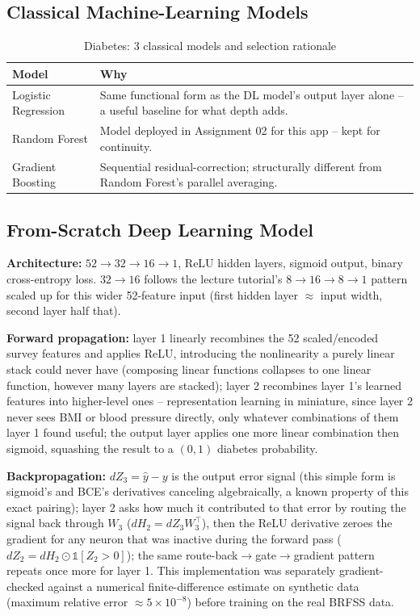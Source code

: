 \documentclass[11pt, a4paper]{article}
\begin{document}
\subsection{Classical Machine-Learning Models}
\begin{table}[H]
\centering
\begin{tabularx}{\textwidth}{@{}l X@{}}
\toprule
\textbf{Model} & \textbf{Why} \\
\midrule
Logistic Regression & Same functional form as the DL model's output layer alone -- a
useful baseline for what depth adds. \\
Random Forest & Model deployed in Assignment 02 for this app -- kept for continuity. \\
Gradient Boosting & Sequential residual-correction; structurally different from Random
Forest's parallel averaging. \\
\bottomrule
\end{tabularx}
\caption{Diabetes: 3 classical models and selection rationale}
\end{table}

\subsection{From-Scratch Deep Learning Model}
\textbf{Architecture:} $52 \to 32 \to 16 \to 1$, ReLU hidden layers, sigmoid output, binary
cross-entropy loss. $32 \to 16$ follows the lecture tutorial's $8 \to 16 \to 8 \to 1$
pattern scaled up for this wider 52-feature input (first hidden layer $\approx$ input
width, second layer half that).

\textbf{Forward propagation:} layer 1 linearly recombines the 52 scaled/encoded survey
features and applies ReLU, introducing the nonlinearity a purely linear stack could never
have (composing linear functions collapses to one linear function, however many layers are
stacked); layer 2 recombines layer 1's learned features into higher-level ones --
representation learning in miniature, since layer 2 never sees BMI or blood pressure
directly, only whatever combinations of them layer 1 found useful; the output layer applies
one more linear combination then sigmoid, squashing the result to a $(0,1)$ diabetes
probability.

\textbf{Backpropagation:} $dZ_3 = \hat{y}-y$ is the output error signal (this simple form is
sigmoid's and BCE's derivatives canceling algebraically, a known property of this exact
pairing); layer 2 asks how much it contributed to that error by routing the signal back
through $W_3$ ($dH_2 = dZ_3 W_3^{\top}$), then the ReLU derivative zeroes the gradient for
any neuron that was inactive during the forward pass ($dZ_2 = dH_2 \odot
\mathbb{1}[Z_2>0]$); the same route-back$\to$gate$\to$gradient pattern repeats once more for
layer 1. This implementation was separately gradient-checked against a numerical
finite-difference estimate on synthetic data (maximum relative error $\approx 5\times
10^{-8}$) before training on the real BRFSS data.
\end{document}
